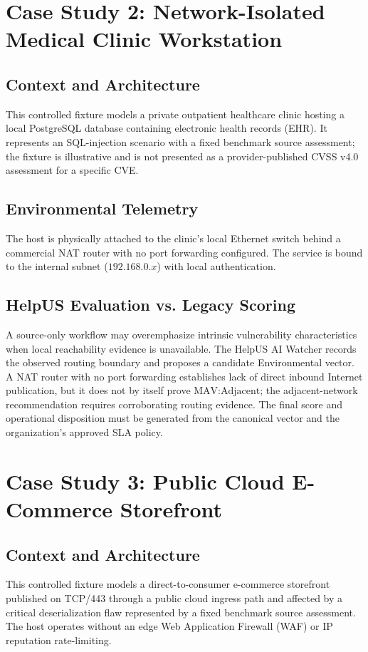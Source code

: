 \section{Case Study 2: Network-Isolated Medical Clinic Workstation}
\subsection{Context and Architecture}
This controlled fixture models a private outpatient healthcare clinic hosting a local PostgreSQL database containing electronic health records (EHR). It represents an SQL-injection scenario with a fixed benchmark source assessment; the fixture is illustrative and is not presented as a provider-published CVSS v4.0 assessment for a specific CVE.

\subsection{Environmental Telemetry}
The host is physically attached to the clinic's local Ethernet switch behind a commercial NAT router with no port forwarding configured. The service is bound to the internal subnet ($192.168.0.x$) with local authentication.

\subsection{HelpUS Evaluation vs. Legacy Scoring}
A source-only workflow may overemphasize intrinsic vulnerability characteristics when local reachability evidence is unavailable. 
The HelpUS AI Watcher records the observed routing boundary and proposes a candidate Environmental vector. A NAT router with no port forwarding establishes lack of direct inbound Internet publication, but it does not by itself prove $\text{MAV:Adjacent}$; the adjacent-network recommendation requires corroborating routing evidence. The final score and operational disposition must be generated from the canonical vector and the organization's approved SLA policy.

\section{Case Study 3: Public Cloud E-Commerce Storefront}
\subsection{Context and Architecture}
This controlled fixture models a direct-to-consumer e-commerce storefront published on TCP/443 through a public cloud ingress path and affected by a critical deserialization flaw represented by a fixed benchmark source assessment. The host operates without an edge Web Application Firewall (WAF) or IP reputation rate-limiting.

